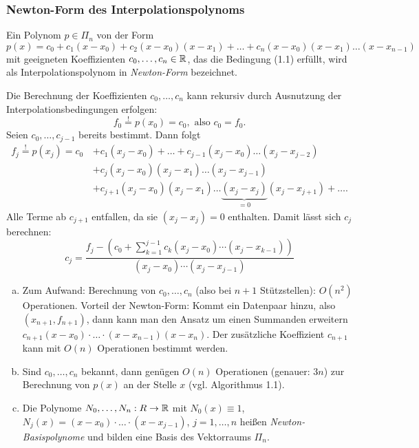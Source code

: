 \subsubsection{Newton-Form des Interpolationspolynoms}
Ein Polynom $p \in \Pi_n$ von der Form 
\begin{equation}
 p(x) = c_0 + c_1(x-x_0) + c_2(x-x_0)(x-x_1) + \ldots + c_n (x-x_0)(x-x_1) \ldots (x-x_{n-1}) 
\end{equation}
mit geeigneten Koeffizienten $c_0, \ldots, c_n \in \mathbb{R}$, das die Bedingung (1.1) erfüllt, wird als Interpolationspolynom in \emph{Newton-Form} bezeichnet.

Die Berechnung der Koeffizienten $c_0, \ldots, c_n$ kann rekursiv durch Ausnutzung der Interpolationsbedingungen erfolgen:
\[ f_0 \overset{!}{=} p(x_0) = c_0, \text{ also } c_0 = f_0. \] 
Seien $c_0, \ldots, c_{j-1}$ bereits bestimmt. Dann folgt
\begin{align*}
 f_j \overset{!}{=} p(x_j) = c_0\, &+ c_1 (x_j-x_0) + \ldots + c_{j-1} (x_j-x_0) \ldots (x_j-x_{j-2}) \\
   &+ c_j (x_j-x_0)(x_j-x_1) \ldots (x_j-x_{j-1}) \\
   &+ c_{j+1} (x_j-x_0)(x_j-x_1) \ldots \underbrace{(x_j-x_j)}_{=0}(x_j-x_{j+1} ) + \ldots . 
\end{align*}
Alle Terme ab $c_{j+1}$ entfallen, da sie $(x_j-x_j)=0$ enthalten. Damit lässt sich $c_j$ berechnen:
\[ c_j = \frac{f_j - \left( c_0 + \sum_{k=1}^{j-1} c_k (x_j-x_0)\cdots(x_j-x_{k-1}) \right)}{(x_j-x_0) \cdots (x_j-x_{j-1})} \]

\begin{rmrk}
 \begin{enumerate}[(a)]
  \item Zum Aufwand: Berechnung von $c_0, \ldots, c_n$ (also bei $n+1$ Stütz\-stellen): $O(n^2)$ Operationen. Vorteil der Newton-Form: Kommt ein Datenpaar hinzu, also $(x_{n+1}, f_{n+1})$, dann kann man den Ansatz um einen Summanden erweitern $c_{n+1}( x-x_0 ) \cdot \ldots \cdot (x - x_{n-1})(x - x_n)$. Der zusätzliche Koeffizient $c_{n+1}$ kann mit $O(n)$ Operationen bestimmt werden.
  \item Sind $c_0, \ldots, c_n$ bekannt, dann genügen $O(n)$ Operationen (genauer: $3n$) zur Berechnung von $p(x)$ an der Stelle $x$ (vgl. Algorithmus 1.1).
  \item Die Polynome $N_0, \ldots, N_n:R \to \mathbb{R}$ mit $N_0(x) \equiv 1$, $N_j(x) = (x-x_0) \cdot \ldots \cdot (x - x_{j-1})$, $j = 1, \ldots, n$ heißen \emph{Newton-Basispolynome} und bilden eine Basis des Vektorraums $\Pi_n$.
 \end{enumerate}
\end{rmrk}

